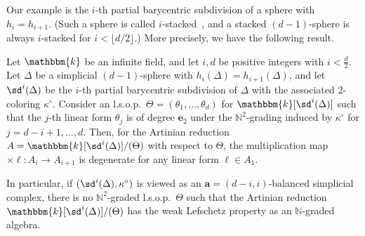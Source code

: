 Our example is the $i$-th partial barycentric subdivision of a sphere with $h_i=h_{i+1}$. (Such a sphere is called $i$-stacked~\cite{MN}, and a stacked $(d-1)$-sphere is always $i$-stacked for $i < \lfloor d/2\rfloor $.)
More precisely, we have the following result. 
\begin{theorem} \label{thm:counterexample}
Let $\mathbbm{k}$ be an infinite field, and let $i, d$ be positive integers with $i < \frac{d}{2}$.
Let $\Delta$ be a simplicial $(d-1)$-sphere with $h_i(\Delta)=h_{i+1}(\Delta)$, and let $\sd^i(\Delta)$ be the $i$-th partial barycentric subdivision of $\Delta$ with the associated $2$-coloring $\kappa^\circ$.
Consider an l.s.o.p.~$\Theta=(\theta_1,\ldots,\theta_d)$ for $\mathbbm{k}[\sd^i(\Delta)]$ such that the $j$-th linear form $\theta_{j}$ is of degree $\bm{e}_2$ under the $\mathbb{N}^2$-grading induced by $\kappa^\circ$ for $j=d-i+1,\ldots,d$.
Then, for the Artinian reduction $A=\mathbbm{k}[\sd^i(\Delta)]/(\Theta)$ with respect to $\Theta$, the multiplication map $\times \ell:A_i \rightarrow A_{i+1}$ is degenerate for any linear form $\ell \in A_1$.

In particular, if $(\sd^i(\Delta),\kappa^\circ)$ is viewed as an $\bm{a}=(d-i,i)$-balanced simplicial complex, there is no $\mathbb{N}^2$-graded l.s.o.p.~$\Theta$ such that the Artinian reduction $\mathbbm{k}[\sd^i(\Delta)]/(\Theta)$ has the weak Lefschetz property as an $\mathbb{N}$-graded algebra.
\end{theorem}
